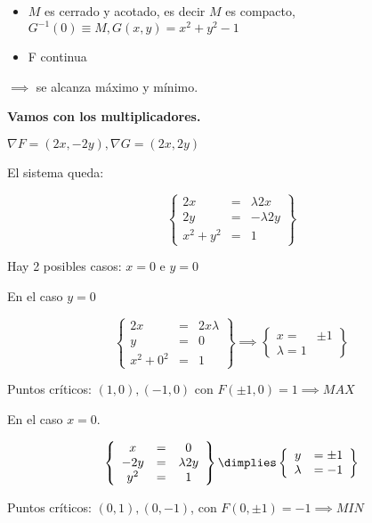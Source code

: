 
\begin{itemize}
\item $M$ es cerrado y acotado, es decir $M$ es compacto, $G^{-1}({0}) \equiv M, G(x,y) = x^2+y^2-1$
\item F continua
\end{itemize}

 $\implies$ se alcanza máximo y mínimo.


\textbf{Vamos con los multiplicadores.}

$\nabla F = (2x,-2y), \nabla G=(2x,2y)$

El sistema queda:

\[\left\{\begin{array}{ccc}
2x &=& \lambda 2x \\
2y &=& -\lambda 2y\\
x^2+y^2 &=& 1
\end{array}\right\}\]

Hay 2 posibles casos: $x=0$ e $y=0$

En el caso $y=0$

\[\left\{\begin{array}{ccc}2x&=&2x \lambda \\y&=&0\\x^2+0^2&=&1\end{array}\right\} \implies \left\{\begin{array}{cc}x=&\pm 1 \\ \lambda=1 \end{array}\right\}\]

Puntos críticos: $(1,0),(-1,0)$ con $F(\pm 1,0) = 1 \implies MAX$

En el caso $x = 0$.

\[ \left\{\begin{array}{ccc}
x &=& 0\\
-2y &=& \lambda 2y \\
y^2 &=& 1
\end{array}\right\}\dimplies
\left\{ \begin{array}{cc}
y &= \pm 1\\
\lambda &= -1
\end{array}\right\}\]

Puntos críticos: $(0,1),(0,-1)$, con $F(0,\pm 1) = -1 \implies MIN$

